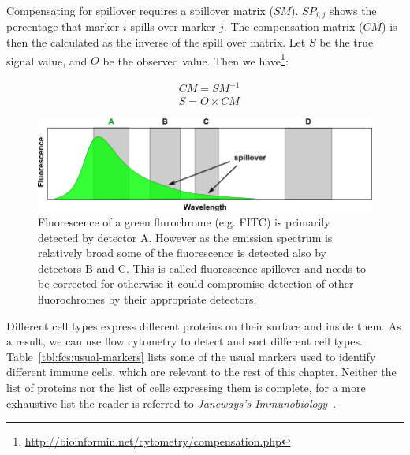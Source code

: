 Compensating for spillover requires a spillover matrix ($SM$). $SP_{i,j}$ shows the percentage that marker $i$ spills over marker $j$. The compensation matrix ($CM$) is then the calculated as the inverse of the spill over matrix. Let $S$ be the true signal value, and $O$ be the observed value. Then we have\footnote{\url{http://bioinformin.net/cytometry/compensation.php}}:

\begin{align}
  &CM = SM^{-1} \nonumber \\
  &S = O \times CM
  \label{fml:fcs-compensation}
\end{align}

\begin{figure}[!ht]
  \centering
  \includegraphics[width=.8\textwidth]{figs/FITC_spillover_onLSRII_s}
  \caption[Flow Cytometry Spillover Effect]{Fluorescence of a green flurochrome (e.g. FITC) is primarily detected by detector A. However as the emission spectrum is relatively broad some of the fluorescence is detected also by detectors B and C. This is called fluorescence spillover and needs to be corrected for otherwise it could compromise detection of other fluorochromes by their appropriate detectors\footnotemark[1].}
  \label{fig:flow-cytometry-spillover}
\end{figure}

Different cell types express different proteins on their surface and inside them. As a result, we can use flow cytometry to detect and sort different cell types. Table~\ref{tbl:fcs:usual-markers} lists some of the usual markers used to identify different immune cells, which are relevant to the rest of this chapter. Neither the list of proteins nor the list of cells expressing them is complete, for a more exhaustive list the reader is referred to \emph{Janeways's Immunobiology}~\cite{murphy2016janeway}.


